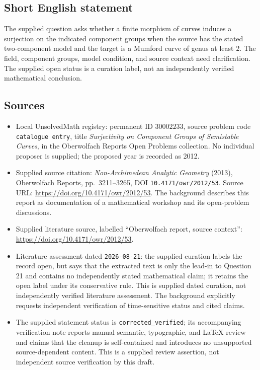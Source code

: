 \documentclass[11pt]{article}
\begin{document}
\subsection{Short English statement}
The supplied question asks whether a finite morphism of curves induces a surjection on the indicated component groups when the source has the stated two-component model and the target is a Mumford curve of genus at least \(2\). The field, component groups, model condition, and source context need clarification. The supplied open status is a curation label, not an independently verified mathematical conclusion.
\subsection{Sources}
\begin{itemize}
\item Local UnsolvedMath registry: permanent ID \(30002233\), source problem code \texttt{catalogue entry}, title \emph{Surjectivity on Component Groups of Semistable Curves}, in the Oberwolfach Reports Open Problems collection. No individual proposer is supplied; the proposed year is recorded as 2012.
\item Supplied source citation: \emph{Non-Archimedean Analytic Geometry} (2013), Oberwolfach Reports, pp.\ 3211--3265, DOI \texttt{10.4171/owr/2012/53}. Source URL: \url{https://doi.org/10.4171/owr/2012/53}. The background describes this report as documentation of a mathematical workshop and its open-problem discussions.
\item Supplied literature source, labelled ``Oberwolfach report, source context'': \url{https://doi.org/10.4171/owr/2012/53}.
\item Literature assessment dated \texttt{2026-08-21}: the supplied curation labels the record open, but says that the extracted text is only the lead-in to Question 21 and contains no independently stated mathematical claim; it retains the open label under its conservative rule. This is supplied dated curation, not independently verified literature assessment. The background explicitly requests independent verification of time-sensitive status and cited claims.
\item The supplied statement status is \texttt{corrected\_verified}; its accompanying verification note reports manual semantic, typographic, and LaTeX review and claims that the cleanup is self-contained and introduces no unsupported source-dependent content. This is a supplied review assertion, not independent source verification by this draft.
\end{itemize}
\end{document}
